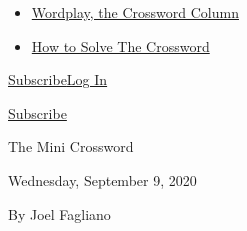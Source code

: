 \begin{itemize}
\tightlist
\item
  \href{https://www.nytimes3xbfgragh.onion/column/wordplay}{Wordplay,
  the Crossword Column}
\item
  \href{https://www.nytimes3xbfgragh.onion/guides/crosswords/how-to-solve-a-crossword-puzzle}{How
  to Solve The Crossword}
\end{itemize}

\href{https://www.nytimes3xbfgragh.onion/subscription/games?campaignId=9HH7K}{Subscribe}\href{https://myaccount.nytimes3xbfgragh.onion/auth/login?application=crosswords\&asset=navigation-drawer\&client_id=games\&redirect_uri=\&response_type=cookie}{Log
In}

\href{https://www.nytimes3xbfgragh.onion/subscription/games?campaignId=9JF99}{Subscribe}

The Mini Crossword

Wednesday, September 9, 2020

By Joel Fagliano

